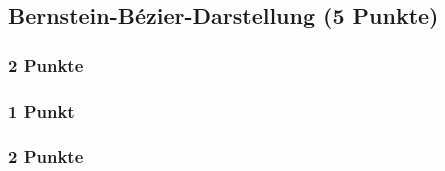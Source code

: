 \newif\ifvimbug
\vimbugfalse

\ifvimbug

\fi


\subsection{Bernstein-Bézier-Darstellung (5 Punkte)}
\subsubsection{2 Punkte}

\subsubsection{1 Punkt}

\subsubsection{2 Punkte}